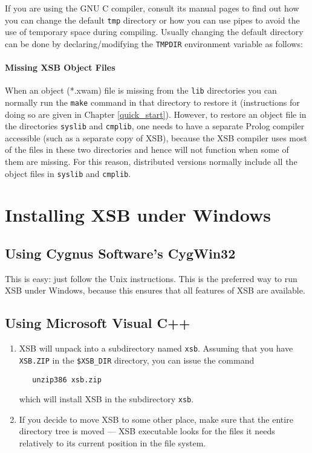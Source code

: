 \noindent
If you are using the GNU C compiler, consult its manual pages
to find out how you can change the default {\tt tmp} directory or how you
can use pipes to avoid the use of temporary space during compiling.
Usually changing the default directory can be done by declaring/modifying
the {\tt TMPDIR} environment variable as follows:


\paragraph*{Missing XSB Object Files}
When an object (*.xwam) file is missing from the {\tt lib} directories
you can normally run the {\tt make} command in that directory to
restore it (instructions for doing so are given in Chapter
\ref{quick_start}).  However, to restore an object file in the
directories {\tt syslib} and {\tt cmplib}, one needs to have a
separate Prolog compiler accessible (such as a separate copy of
XSB), because the XSB compiler uses most of the files in these
two directories and hence will not function when some of them are
missing.  For this reason, distributed versions normally include all
the object files in {\tt syslib} and {\tt cmplib}.

\section{Installing XSB under Windows}
\subsection{Using Cygnus Software's \mbox{CygWin32}}
\label{quick:cygwin}

This is easy: just follow the Unix instructions. This is the preferred way to
run XSB under Windows, because this ensures that all features of XSB are
available.


\subsection{Using Microsoft Visual C++}
\label{quick:DOS}

\begin{enumerate}
\item 
   XSB will unpack into a subdirectory named {\tt xsb}.
   Assuming that you have {\tt XSB.ZIP} in the {\tt \$XSB\_DIR} directory,
   you can issue the command
\begin{verbatim}
   unzip386 xsb.zip
\end{verbatim}
   which will install XSB in the subdirectory {\tt xsb}.

 \item If you decide to move XSB to some other place, make sure that the
   entire directory tree is moved --- XSB executable looks for the files it
   needs relatively to its current position in the file system.

\end{enumerate}


